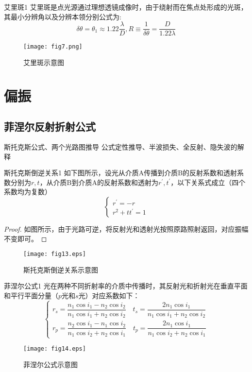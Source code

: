 \begin{myprop}{艾里斑}{1}
	艾里斑是点光源通过理想透镜成像时，由于绕射而在焦点处形成的光斑，其最小分辨角以及分辨本领分别公式为:
	\[
		\delta \theta=\theta_1 \approx 1.22 \frac{\lambda}{D},R \equiv \frac{1}{\delta \theta}=\frac{D}{1.22 \lambda}
	\]
\end{myprop}
\begin{figure}[!htp]
	\centering
	\texttt{[image: fig7.png]}
	\caption{艾里斑示意图}
\end{figure}








\section{偏振}

\subsection{菲涅尔反射折射公式}

斯托克斯公式、两个光路图推导
公式定性推导、半波损失、全反射、隐失波的解释

\begin{myprop}{斯托克斯倒逆关系}{1}
如下图所示，设光从介质A传播到介质B的反射系数和透射系数分别为$r,t$，从介质B到介质A的反射系数和透射为$r^{\prime},t^{\prime}$，以下关系式成立（四个系数均为复数）
	\[
		\left\{\begin{array}{l}r^{\prime}=-r \\ r^2+t t^{\prime}=1\end{array}\right.
	\]
\end{myprop}
\begin{proof}
	如图所示，由于光路可逆，将反射光和透射光按照原路照射返回，对应振幅不变即可。
\end{proof}
\begin{figure}[!htp]
	\centering
	\texttt{[image: fig13.eps]}
	\caption{斯托克斯倒逆关系示意图}
\end{figure}

\begin{myprop}{菲涅尔公式}{1}
	光在两种不同折射率的介质中传播时，其反射光和折射光在垂直平面和平行平面分量（$p$光和$s$光）对应系数如下：
		\[
			\left\{\begin{array}{l}
				r_s=\dfrac{n_1 \cos i_1-n_2 \cos i_2}{n_1 \cos i_1+n_2 \cos i_2} \quad t_s=\dfrac{2 n_1 \cos i_1}{n_1 \cos i_1+n_2 \cos i_2} \\
				r_p=\dfrac{n_2 \cos i_1-n_1 \cos i_2}{n_1 \cos i_2+n_2 \cos i_1} \quad t_p=\dfrac{2 n_1 \cos i_1}{n_1 \cos i_2+n_2 \cos i_1}
				\end{array}\right.
		\]
\end{myprop}
\begin{figure}[!htp]
	\centering
	\texttt{[image: fig14.eps]}
	\caption{菲涅尔公式示意图}
\end{figure}

